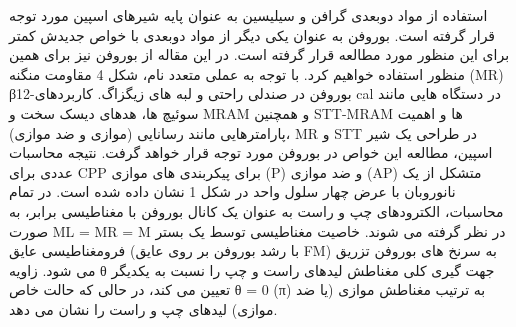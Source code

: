 استفاده از مواد دوبعدی گرافن و سیلیسین به عنوان پایه شیرهای اسپین مورد توجه قرار گرفته است. بوروفن به عنوان یکی دیگر از مواد دوبعدی با خواص جدیدش کمتر برای این منظور مورد مطالعه قرار گرفته است. در این مقاله از بوروفن نیز برای همین منظور استفاده خواهیم کرد. با توجه به عملی متعدد نام، شکل 4 مقاومت منگنه (MR) β12-بوروفن در صندلی راحتی و لبه های زیگزاگ. کاربردهای cal در دستگاه هایی مانند سوئیچ ها، هدهای دیسک سخت و MRAM و همچنین STT-MRAM ها و اهمیت پارامترهایی مانند رسانایی (موازی و ضد موازی)، MR و STT در طراحی یک شیر اسپین، مطالعه این خواص در بوروفن مورد توجه قرار خواهد گرفت. نتیجه محاسبات عددی برای CPP برای پیکربندی های موازی (P) و ضد موازی (AP) متشکل از یک نانوروبان با عرض چهار سلول واحد در شکل 1 نشان داده شده است. در تمام محاسبات، الکترودهای چپ و راست به عنوان یک کانال بوروفن با مغناطیسی برابر، به صورت ML = MR = M در نظر گرفته می شوند. خاصیت مغناطیسی توسط یک بستر فرومغناطیسی عایق (با رشد بوروفن بر روی عایق FM) به سرنخ های بوروفن تزریق می شود. زاویه θ جهت گیری کلی مغناطش لیدهای راست و چپ را نسبت به یکدیگر تعیین می کند، در حالی که حالت خاص θ = 0 (π) به ترتیب مغناطش موازی (یا ضد موازی) لیدهای چپ و راست را نشان می دهد.


